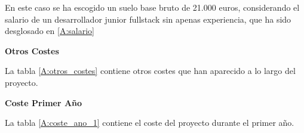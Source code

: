 En este caso se ha escogido un suelo base bruto de 21.000 euros, considerando el salario de un desarrollador junior fullstack sin apenas experiencia, que ha sido desglosado en \ref{A:salario}

\begin{table}[H]
    \label{A:salario}
    \caption{Desglose Coste anual del Webmaster}
\end{table}

\textbf{Otros Costes}

La tabla \ref{A:otros_costes} contiene otros costes que han aparecido a lo largo del proyecto. 
\begin{table}[H]
    \label{A:otros_costes}
    \caption{Coste anual del Webmaster}
\end{table}
\textbf{Coste Primer Año}

La tabla  \ref{A:coste_ano_1} contiene el coste del proyecto durante el primer año. 

\begin{table}[H]
    \label{A:coste_ano_1}
    \caption{Coste durante el primer año}
\end{table}

